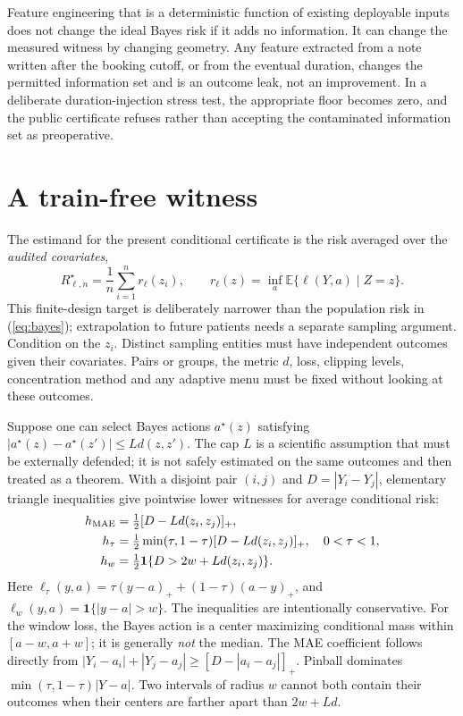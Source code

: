 \documentclass[11pt,a4paper]{article}
\newcommand{\risk}{R^{\star}}
\begin{document}
Feature engineering that is a deterministic function of existing deployable inputs does not change the ideal Bayes risk if it adds no information. It can change the measured witness by changing geometry. Any feature extracted from a note written after the booking cutoff, or from the eventual duration, changes the permitted information set and is an outcome leak, not an improvement. In a deliberate duration-injection stress test, the appropriate floor becomes zero, and the public certificate refuses rather than accepting the contaminated information set as preoperative.

\section{A train-free witness}

The estimand for the present conditional certificate is the risk averaged over the \emph{audited covariates},
\begin{equation}
\risk_{\ell,n}=\frac1n\sum_{i=1}^n r_\ell(z_i),\qquad
r_\ell(z)=\inf_a\mathbb E\{\ell(Y,a)\mid Z=z\}.\label{eq:finite}
\end{equation}
This finite-design target is deliberately narrower than the population risk in (\ref{eq:bayes}); extrapolation to future patients needs a separate sampling argument. Condition on the $z_i$. Distinct sampling entities must have independent outcomes given their covariates. Pairs or groups, the metric $d$, loss, clipping levels, concentration method and any adaptive menu must be fixed without looking at these outcomes.

Suppose one can select Bayes actions $a^\star(z)$ satisfying $|a^\star(z)-a^\star(z')|\leq Ld(z,z')$. The cap $L$ is a scientific assumption that must be externally defended; it is not safely estimated on the same outcomes and then treated as a theorem. With a disjoint pair $(i,j)$ and $D=|Y_i-Y_j|$, elementary triangle inequalities give pointwise lower witnesses for average conditional risk:
\begin{align}
h_{\rm MAE}&=\tfrac12[D-Ld(z_i,z_j)]_+,\label{eq:maepair}\\
h_{\tau}&=\tfrac12\min(\tau,1-\tau)[D-Ld(z_i,z_j)]_+,\quad 0<\tau<1,\label{eq:pinpair}\\
h_w&=\tfrac12\mathbf 1\{D>2w+Ld(z_i,z_j)\}.\label{eq:wpair}
\end{align}
Here $\ell_\tau(y,a)=\tau(y-a)_++(1-\tau)(a-y)_+$, and $\ell_w(y,a)=\mathbf 1\{|y-a|>w\}$. The inequalities are intentionally conservative. For the window loss, the Bayes action is a center maximizing conditional mass within $[a-w,a+w]$; it is generally \emph{not} the median. The MAE coefficient follows directly from $|Y_i-a_i|+|Y_j-a_j|\geq[D-|a_i-a_j|]_+$. Pinball dominates $\min(\tau,1-\tau)|Y-a|$. Two intervals of radius $w$ cannot both contain their outcomes when their centers are farther apart than $2w+Ld$.
\end{document}
